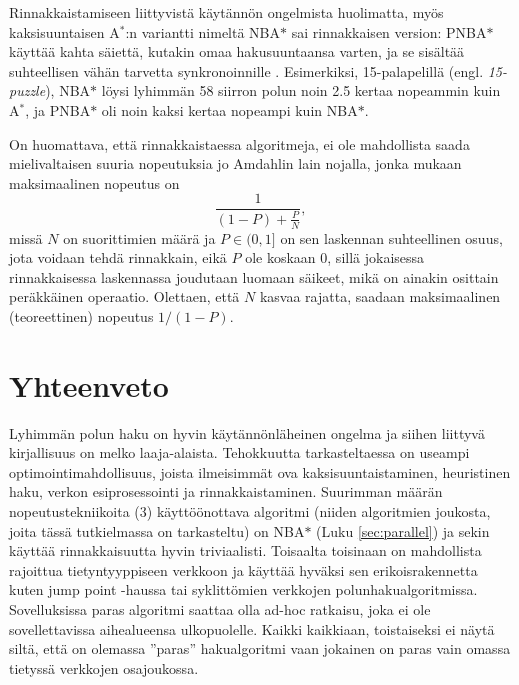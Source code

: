 \documentclass[finnish]{tktltiki2}
\theoremstyle{definition}
\theoremstyle{remark}
\begin{document}
Rinnakkaistamiseen liittyvistä käytännön ongelmista huolimatta, myös kaksisuuntaisen A$^{\ast}$:n variantti nimeltä NBA$\ast$ sai rinnakkaisen version: PNBA$\ast$ käyttää kahta säiettä, kutakin omaa hakusuuntaansa varten, ja se sisältää suhteellisen vähän tarvetta synkronoinnille \cite{Rios}. Esimerkiksi, 15-palapelillä (engl. \textit{15-puzzle}), NBA$\ast$ löysi lyhimmän 58 siirron polun noin 2.5 kertaa nopeammin kuin A$^{\ast}$, ja PNBA$\ast$ oli noin kaksi kertaa nopeampi kuin NBA$\ast$.

On huomattava, että rinnakkaistaessa algoritmeja, ei ole mahdollista saada mielivaltaisen suuria nopeutuksia jo Amdahlin lain nojalla, jonka mukaan maksimaalinen nopeutus on
\[
\frac{1}{(1 - P) + \frac{P}{N}},
\]
missä $N$ on suorittimien määrä ja $P \in (0, 1]$ on sen laskennan suhteellinen osuus, jota voidaan tehdä rinnakkain, eikä $P$ ole koskaan 0, sillä jokaisessa rinnakkaisessa laskennassa joudutaan luomaan säikeet, mikä on ainakin osittain peräkkäinen operaatio. Olettaen, että $N$ kasvaa rajatta, saadaan maksimaalinen (teoreettinen) nopeutus $1 / (1 - P)$.

\section{Yhteenveto}
Lyhimmän polun haku on hyvin käytännönläheinen ongelma ja siihen liittyvä kirjallisuus on melko laaja-alaista. Tehokkuutta tarkasteltaessa on useampi optimointimahdollisuus, joista ilmeisimmät ova kaksisuuntaistaminen, heuristinen haku, verkon esiprosessointi ja rinnakkaistaminen. Suurimman määrän nopeutustekniikoita (3) käyttöönottava algoritmi (niiden algoritmien joukosta, joita tässä tutkielmassa on tarkasteltu) on NBA$\ast$ (Luku \ref{sec:parallel}) ja sekin käyttää rinnakkaisuutta hyvin triviaalisti. Toisaalta toisinaan on mahdollista rajoittua tietyntyyppiseen verkkoon ja käyttää hyväksi sen erikoisrakennetta kuten jump point -haussa tai syklittömien verkkojen polunhakualgoritmissa. Sovelluksissa paras algoritmi saattaa olla ad-hoc ratkaisu, joka ei ole sovellettavissa aihealueensa ulkopuolelle. Kaikki kaikkiaan, toistaiseksi ei näytä siltä, että on olemassa ''paras'' hakualgoritmi vaan jokainen on paras vain omassa tietyssä verkkojen osajoukossa.







% 
\end{document}
